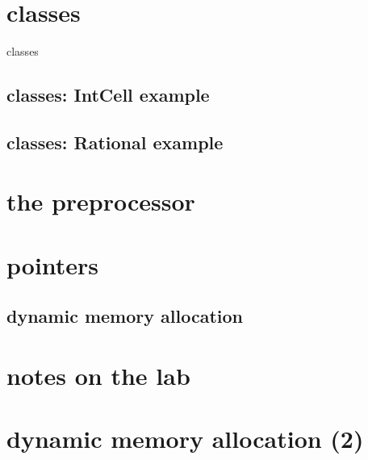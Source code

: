 

%

\section{classes}

\begin{frame}{classes}
\end{frame}

\subsection{classes: IntCell example}



\subsection{classes: Rational example}




\section{the preprocessor}





\section{pointers}



\subsection{dynamic memory allocation}



\section{notes on the lab}




\section{dynamic memory allocation (2)}

